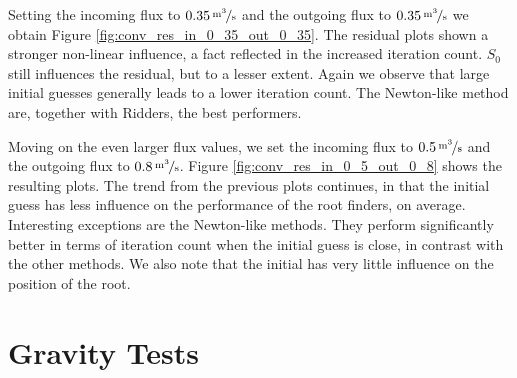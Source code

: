 Setting the incoming flux to $\unitfrac[0.35]{m^3}{s}$ and the outgoing flux to $\unitfrac[0.35]{m^3}{s}$ we obtain Figure \ref{fig:conv_res_in_0_35_out_0_35}. The residual plots shown a stronger non-linear influence, a fact reflected in the increased iteration count. $S_0$ still influences the residual, but to a lesser extent. Again we observe that large initial guesses generally leads to a lower iteration count. The Newton-like method are, together with Ridders, the best performers.

Moving on the even larger flux values, we set the incoming flux to $\unitfrac[0.5]{m^3}{s}$ and the outgoing flux to $\unitfrac[0.8]{m^3}{s}$. Figure \ref{fig:conv_res_in_0_5_out_0_8} shows the resulting plots. The trend from the previous plots continues, in that the initial guess has less influence on the performance of the root finders, on average. Interesting exceptions are the Newton-like methods. They perform significantly better in terms of iteration count when the initial guess is close, in contrast with the other methods. We also note that the initial has very little influence on the position of the root.





\clearpage
\section{Gravity Tests}
%
